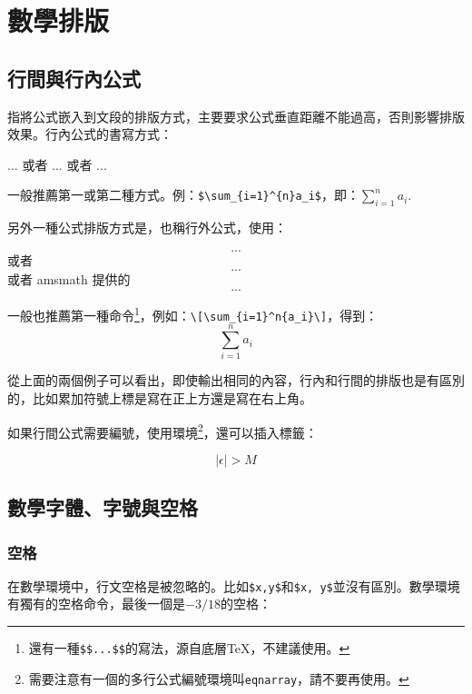 \chapter{數學排版}
\section{行間與行內公式}
指將公式嵌入到文段的排版方式，主要要求公式垂直距離不能過高，否則影響排版效果。行內公式的書寫方式：
\begin{latex}
$...$ 或者 \(...\) 或者 \begin{math}...\end{math}
\end{latex}

一般推薦第一或第二種方式。例：\verb|$\sum_{i=1}^{n}a_i$|，即：$\sum_{i=1}^{n}a_i$.

另外一種公式排版方式是，也稱行外公式，使用：
\begin{latex}
\[...\] 或者 \begin{displaymath}...\end{displaymath}
或者 amsmath 提供的 \begin{equation*}...\end{equation*}
\end{latex}

一般也推薦第一種命令\footnote{還有一種\texttt{\$\$...\$\$}的寫法，源自底層\TeX，不建議使用。}，例如：\verb|\[\sum_{i=1}^n{a_i}\]|，得到：
\[\sum_{i=1}^{n}a_i\]

從上面的兩個例子可以看出，即使輸出相同的內容，行內和行間的排版也是有區別的，比如累加符號上標是寫在正上方還是寫在右上角。

如果行間公式需要編號，使用環境\footnote{需要注意有一個的多行公式編號環境叫\texttt{eqnarray}，請不要再使用。}，還可以插入標籤：

\begin{codeshow}
\begin{equation}
\label{eq:NoExample}
  |\epsilon|>M
\end{equation}
\end{codeshow}

\section{數學字體、字號與空格}
\label{sec:mathfont}
\subsection{空格}
在數學環境中，行文空格是被忽略的。比如\verb|$x,y$|和\verb|$x, y$|並沒有區別。數學環境有獨有的空格命令，最後一個是$-3/18$的空格：

